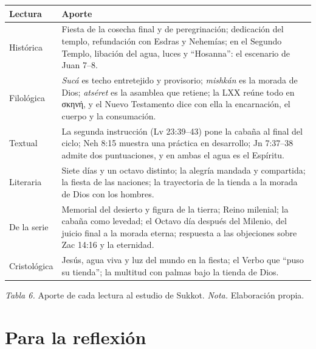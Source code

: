 \documentclass[11pt,letterpaper]{article}
\newcommand{\grc}[1]{\foreignlanguage{ancientgreek}{#1}}
\begin{document}
\begin{center}\small\renewcommand{\arraystretch}{1.22}
\begin{tabular}{@{}L{2.8cm}L{11.6cm}@{}}
\toprule
\textbf{Lectura} & \textbf{Aporte} \\ \midrule
Histórica & Fiesta de la cosecha final y de peregrinación; dedicación del templo, refundación con Esdras y Nehemías; en el Segundo Templo, libación del agua, luces y ``Hosanna'': el escenario de Juan 7--8. \\
Filológica & \emph{Sucá} es techo entretejido y provisorio; \emph{mishkán} es la morada de Dios; \emph{atséret} es la asamblea que retiene; la LXX reúne todo en \grc{σκηνή}, y el Nuevo Testamento dice con ella la encarnación, el cuerpo y la consumación. \\
Textual & La segunda instrucción (Lv 23:39--43) pone la cabaña al final del ciclo; Neh 8:15 muestra una práctica en desarrollo; Jn 7:37--38 admite dos puntuaciones, y en ambas el agua es el Espíritu. \\
Literaria & Siete días y un octavo distinto; la alegría mandada y compartida; la fiesta de las naciones; la trayectoria de la tienda a la morada de Dios con los hombres. \\
De la serie & Memorial del desierto y figura de la tierra; Reino milenial; la cabaña como levedad; el Octavo día después del Milenio, del juicio final a la morada eterna; respuesta a las objeciones sobre Zac 14:16 y la eternidad. \\
Cristológica & Jesús, agua viva y luz del mundo en la fiesta; el Verbo que ``puso su tienda''; la multitud con palmas bajo la tienda de Dios. \\
\bottomrule
\end{tabular}\par
{\footnotesize\color{sepia}\textit{Tabla 6.} Aporte de cada lectura al estudio de Sukkot. \textit{Nota.} Elaboración propia.}
\end{center}

\section{Para la reflexión}
\end{document}
